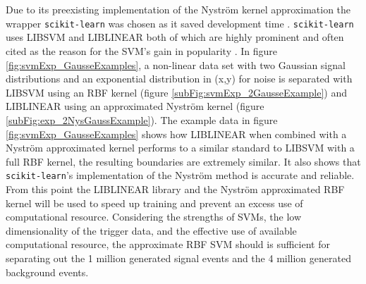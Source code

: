 \\\\Due to its preexisting implementation of the Nyström kernel approximation the wrapper \texttt{scikit-learn} was chosen as it saved development time \cite{scikit-learn}. \texttt{scikit-learn} uses LIBSVM \cite{chang2011libsvm} and LIBLINEAR \cite{fan2008liblinear} both of which are highly prominent and often cited as the reason for the SVM's gain in popularity \cite{murty2016support}. In figure \ref{fig:svmExp_GausseExamples}, a non-linear data set with two Gaussian signal distributions and an exponential distribution in (x,y) for noise is separated with LIBSVM using an RBF kernel (figure \ref{subFig:svmExp_2GausseExample}) and LIBLINEAR using an approximated Nyström kernel (figure \ref{subFig:exp_2NysGaussExample}). The example data in figure \ref{fig:svmExp_GausseExamples} shows how LIBLINEAR when combined with a Nyström approximated kernel performs to a similar standard to LIBSVM with a full RBF kernel, the resulting boundaries are extremely similar. It also shows that \texttt{scikit-learn}'s implementation of the Nyström method is accurate and reliable. From this point the LIBLINEAR library and the Nyström approximated RBF kernel will be used to speed up training and prevent an excess use of computational resource. Considering the strengths of SVMs, the low dimensionality of the trigger data, and the effective use of available computational resource, the approximate RBF SVM should is sufficient for separating out the 1 million generated signal events and the 4 million generated background events. 

